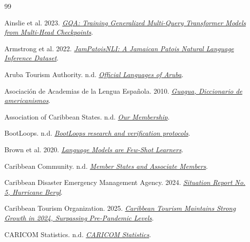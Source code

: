 \begin{thebibliography}{99}
Ainslie et al. 2023. \href{https://arxiv.org/abs/2305.13245}{\emph{GQA: Training Generalized Multi-Query Transformer Models from Multi-Head Checkpoints}}.

Armstrong et al. 2022. \href{https://aclanthology.org/2022.findings-emnlp.389/}{\emph{JamPatoisNLI: A Jamaican Patois Natural Language Inference Dataset}}.

Aruba Tourism Authority. n.d. \href{https://www.aruba.com/uk/our-island/island-facts/language}{\emph{Official Languages of Aruba}}.

Asociación de Academias de la Lengua Española. 2010. \href{https://www.asale.org/damer/guagua}{\emph{Guagua, Diccionario de americanismos}}.

Association of Caribbean States. n.d. \href{https://www.acs-aec.org/en/about-us/our-membership}{\emph{Our Membership}}.

BootLoops. n.d. \href{https://github.com/BootLoops-ai/skills}{\emph{BootLoops research and verification protocols}}.

Brown et al. 2020. \href{https://arxiv.org/abs/2005.14165}{\emph{Language Models are Few-Shot Learners}}.

Caribbean Community. n.d. \href{https://caricom.org/member-states-and-associate-members/}{\emph{Member States and Associate Members}}.

Caribbean Disaster Emergency Management Agency. 2024. \href{https://www.cdema.org/images/2024/07/CDEMA\%20SITREP5_Hurricane\%20Beryl.pdf}{\emph{Situation Report No. 5, Hurricane Beryl}}.

Caribbean Tourism Organization. 2025. \href{https://www.onecaribbean.org/caribbean-tourism-maintains-strong-growth-in-2024-surpassing-pre-pandemic-levels/}{\emph{Caribbean Tourism Maintains Strong Growth in 2024, Surpassing Pre-Pandemic Levels}}.

CARICOM Statistics. n.d. \href{https://statistics.caricom.org/}{\emph{CARICOM Statistics}}.


\end{thebibliography}
